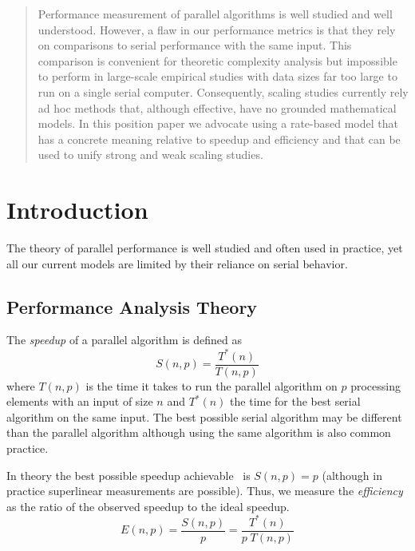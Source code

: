 \documentclass[conference]{IEEEtran}
\newcommand*{\lcite}[1]{~\cite{#1}}
\newcommand*{\keyterm}[1]{\emph{#1}}
\begin{document}
\maketitle


\begin{abstract}
Performance measurement of parallel algorithms is well studied and well
understood. However, a flaw in our performance metrics is that they rely on
comparisons to serial performance with the same input. This comparison is
convenient for theoretic complexity analysis but impossible to perform in
large-scale empirical studies with data sizes far too large to run on a
single serial computer.  Consequently, scaling studies currently rely ad
hoc methods that, although effective, have no grounded mathematical models.
In this position paper we advocate using a rate-based model that has a
concrete meaning relative to speedup and efficiency and that can be used to
unify strong and weak scaling studies.
\end{abstract}

\section{Introduction}

\noindent
The theory of parallel performance is well studied and often used in
practice, yet all our current models are limited by their reliance on
serial behavior.

\subsection{Performance Analysis Theory}

\noindent
The \keyterm{speedup} of a parallel algorithm is defined as
\begin{equation}
  S(n,p) = \frac{T^*(n)}{T(n,p)}
  \label{eq:Speedup}
\end{equation}
where $T(n,p)$ is the time it takes to run the parallel algorithm on $p$
processing elements with an input of size $n$ and $T^*(n)$ the time for the
best serial algorithm on the same input. The best possible serial algorithm
may be different than the parallel algorithm although using the same
algorithm is also common practice.

In theory the best possible speedup achievable\lcite{Faber1986} is $S(n,p)
= p$ (although in practice superlinear measurements are possible). Thus, we
measure the \keyterm{efficiency} as the ratio of the observed speedup to
the ideal speedup.
\begin{equation}
  E(n,p) = \frac{S(n,p)}{p} = \frac{T^*(n)}{p \; T(n,p)}
  \label{eq:Efficiency}
\end{equation}
\end{document}
